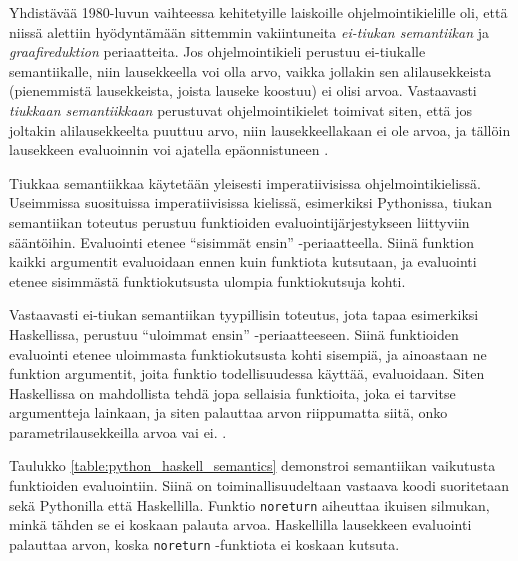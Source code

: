 Yhdistävää 1980-luvun vaihteessa kehitetyille laiskoille ohjelmointikielille oli, että niissä alettiin hyödyntämään sittemmin vakiintuneita \textit{ei-tiukan semantiikan} ja \textit{graafireduktion} periaatteita. Jos ohjelmointikieli perustuu ei-tiukalle semantiikalle, niin lausekkeella voi olla arvo, vaikka jollakin sen alilausekkeista (pienemmistä lausekkeista, joista lauseke koostuu) ei olisi arvoa. Vastaavasti \textit{tiukkaan semantiikkaan} perustuvat ohjelmointikielet toimivat siten, että jos joltakin alilausekkeelta puuttuu arvo, niin lausekkeellakaan ei ole arvoa, ja tällöin lausekkeen evaluoinnin voi ajatella epäonnistuneen \citep[s. 523]{scott2009programming}.

Tiukkaa semantiikkaa käytetään yleisesti imperatiivisissa ohjelmointikielissä. Useimmissa suosituissa imperatiivisissa kielissä, esimerkiksi Pythonissa, tiukan semantiikan toteutus perustuu funktioiden evaluointijärjestykseen liittyviin sääntöihin. Evaluointi etenee ``sisimmät ensin'' -periaatteella. Siinä funktion kaikki argumentit evaluoidaan ennen kuin funktiota kutsutaan, ja evaluointi etenee sisimmästä funktiokutsusta ulompia funktiokutsuja kohti.

Vastaavasti ei-tiukan semantiikan tyypillisin toteutus, jota tapaa esimerkiksi Haskellissa, perustuu ``uloimmat ensin'' -periaatteeseen. Siinä funktioiden evaluointi etenee uloimmasta funktiokutsusta kohti sisempiä, ja ainoastaan ne funktion argumentit, joita funktio todellisuudessa käyttää, evaluoidaan. Siten Haskellissa on mahdollista tehdä jopa sellaisia funktioita, joka ei tarvitse argumentteja lainkaan, ja siten palauttaa arvon riippumatta siitä, onko parametrilausekkeilla arvoa vai ei. \citep{haskellwikinonstrict}.

Taulukko \ref{table:python_haskell_semantics} demonstroi semantiikan vaikutusta funktioiden evaluointiin. Siinä on toiminallisuudeltaan vastaava koodi suoritetaan sekä Pythonilla että Haskellilla. Funktio \verb!noreturn! aiheuttaa ikuisen silmukan, minkä tähden se ei koskaan palauta arvoa. Haskellilla lausekkeen evaluointi palauttaa arvon, koska \verb!noreturn! -funktiota ei koskaan kutsuta.

